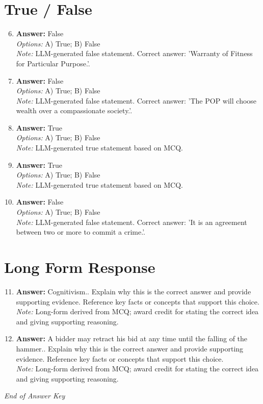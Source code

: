 \documentclass[12pt]{article}
\begin{document}
\section*{True / False}
\begin{enumerate}[label=\arabic*.]
\setcounter{enumi}{5}
\item \textbf{Answer:} False
\\ \textit{Options:} A) True; B) False
\\ \textit{Note:} LLM-generated false statement. Correct answer: 'Warranty of Fitness for Particular Purpose.'.
\item \textbf{Answer:} False
\\ \textit{Options:} A) True; B) False
\\ \textit{Note:} LLM-generated false statement. Correct answer: 'The POP will choose wealth over a compassionate society.'.
\item \textbf{Answer:} True
\\ \textit{Options:} A) True; B) False
\\ \textit{Note:} LLM-generated true statement based on MCQ.
\item \textbf{Answer:} True
\\ \textit{Options:} A) True; B) False
\\ \textit{Note:} LLM-generated true statement based on MCQ.
\item \textbf{Answer:} False
\\ \textit{Options:} A) True; B) False
\\ \textit{Note:} LLM-generated false statement. Correct answer: 'It is an agreement between two or more to commit a crime.'.
\end{enumerate}

\section*{Long Form Response}
\begin{enumerate}[label=\arabic*.]
\setcounter{enumi}{10}
\item \textbf{Answer:} Cognitivism.. Explain why this is the correct answer and provide supporting evidence. Reference key facts or concepts that support this choice.
\\ \textit{Note:} Long-form derived from MCQ; award credit for stating the correct idea and giving supporting reasoning.
\item \textbf{Answer:} A bidder may retract his bid at any time until the falling of the hammer.. Explain why this is the correct answer and provide supporting evidence. Reference key facts or concepts that support this choice.
\\ \textit{Note:} Long-form derived from MCQ; award credit for stating the correct idea and giving supporting reasoning.
\end{enumerate}

\vfill
\noindent\textit{End of Answer Key}
\end{document}
